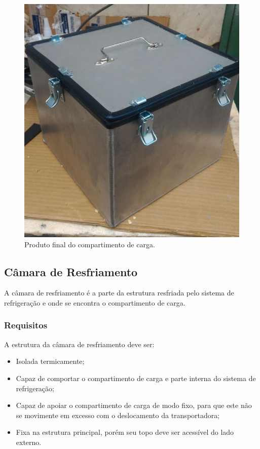 \begin{figure}[H]
	\centering
	\includegraphics[scale=.4]{figuras/compartimento_de_carga.png}
	\caption{Produto final do compartimento de carga.}
\end{figure}


\subsection{Câmara de Resfriamento}

A câmara de resfriamento é a parte da estrutura resfriada pelo sistema de refrigeração e onde se encontra o compartimento de carga.

\subsubsection{Requisitos}

A estrutura da câmara de resfriamento deve ser:

\begin{itemize}
	\item Isolada termicamente;
	\item Capaz de comportar o compartimento de carga e parte interna do sistema de refrigeração;
	\item Capaz de apoiar o compartimento de carga de modo fixo, para que este não se movimente em excesso com o deslocamento da transportadora;
	\item Fixa na estrutura principal, porém seu topo deve ser acessível do lado externo.
\end{itemize}

